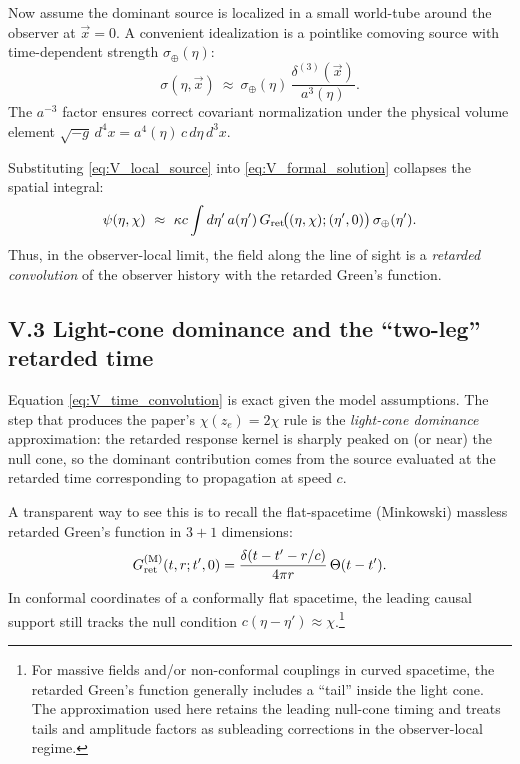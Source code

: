 \documentclass[10pt]{article}
\newcommand{\chis}{\chi}
\begin{document}
Now assume the dominant source is localized in a small world-tube around the observer at $\vec x=0$.
A convenient idealization is a pointlike comoving source with time-dependent strength
$\sigma_\oplus(\eta)$:
\begin{equation}
\sigma(\eta,\vec x)\ \approx\ \sigma_\oplus(\eta)\,
\frac{\delta^{(3)}(\vec x)}{a^3(\eta)}.
\label{eq:V_local_source}
\end{equation}
The $a^{-3}$ factor ensures correct covariant normalization under the physical volume element
$\sqrt{-g}\,d^4x = a^4(\eta)\,c\,d\eta\,d^3x$.

Substituting \eqref{eq:V_local_source} into \eqref{eq:V_formal_solution} collapses the spatial
integral:
\begin{equation}
\psi(\eta,\chis)\ \approx\ \kappa c \int d\eta'\,a(\eta')\,
G_{\rm ret}\!\bigl((\eta,\chis);(\eta',0)\bigr)\,\sigma_\oplus(\eta').
\label{eq:V_time_convolution}
\end{equation}
Thus, in the observer-local limit, the field along the line of sight is a \emph{retarded convolution}
of the observer history with the retarded Green's function.

\subsection{V.3 Light-cone dominance and the ``two-leg'' retarded time}
\label{app:tret_green:two_leg}

Equation \eqref{eq:V_time_convolution} is exact given the model assumptions.
The step that produces the paper’s $\chis(z_e)=2\chis$ rule is the \emph{light-cone dominance}
approximation: the retarded response kernel is sharply peaked on (or near) the null cone, so the
dominant contribution comes from the source evaluated at the retarded time corresponding to
propagation at speed $c$.

A transparent way to see this is to recall the flat-spacetime (Minkowski) massless retarded Green's
function in $3+1$ dimensions:
\begin{equation}
G_{\rm ret}^{\rm (M)}(t,r;t',0)
=
\frac{\delta\!\left(t-t'-r/c\right)}{4\pi r}\,\Theta(t-t').
\label{eq:V_minkowski_green}
\end{equation}
In conformal coordinates of a conformally flat spacetime, the leading causal support still tracks
the null condition $c(\eta-\eta')\approx \chis$.\footnote{For massive fields and/or non-conformal
couplings in curved spacetime, the retarded Green’s function generally includes a ``tail'' inside
the light cone. The approximation used here retains the leading null-cone timing and treats tails
and amplitude factors as subleading corrections in the observer-local regime.}
\end{document}

